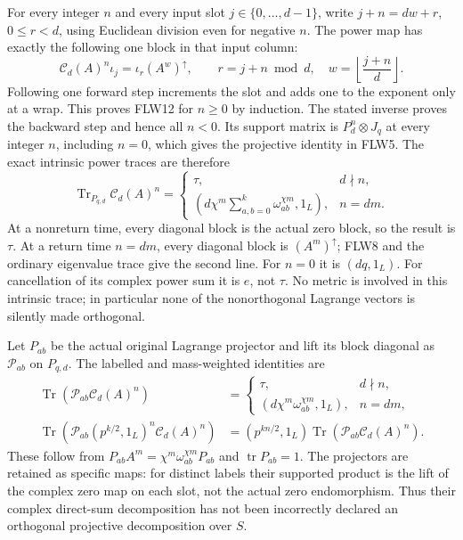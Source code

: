 For every integer $n$ and every input slot $j\in\{0,\ldots,d-1\}$,
write $j+n=dw+r$, $0\le r<d$, using Euclidean division even for
negative $n$. The power map has exactly the following one block
in that input column:
\[
 \mathcal C_d(A)^n\iota_j=\iota_r(A^w)^\uparrow,
 \qquad r=j+n\bmod d,\quad w=\left\lfloor\frac{j+n}{d}\right\rfloor.
 \tag{FLW12}
\]
Following one forward step increments the slot and adds one to the
exponent only at a wrap. This proves FLW12 for $n\ge0$ by induction.
The stated inverse proves the backward step and hence all $n<0$.
Its support matrix is $P_d^n\otimes J_q$ at every integer $n$,
including $n=0$, which gives the projective identity in FLW5.
The exact intrinsic power traces are therefore
\[
 \boxed{\operatorname{Tr}_{P_{q,d}}\mathcal C_d(A)^n
 =\begin{cases}
 \tau,&d\nmid n,\\
 \left(d\chi^m\displaystyle\sum_{a,b=0}^k
                   \omega_{ab}^{\chi m},1_L\right),&n=dm.
 \end{cases}}
 \tag{FLW13}
\]
At a nonreturn time, every diagonal block is the actual zero block,
so the result is $\tau$. At a return time $n=dm$, every diagonal
block is $(A^m)^\uparrow$; FLW8 and the ordinary eigenvalue trace
give the second line. For $n=0$ it is $(dq,1_L)$.
For cancellation of its complex power sum it is $e$, not $\tau$.
No metric is involved in this intrinsic trace; in particular none
of the nonorthogonal Lagrange vectors is silently made orthogonal.

Let $P_{ab}$ be the actual original Lagrange projector and lift
its block diagonal as $\mathcal P_{ab}$ on $P_{q,d}$. The labelled
and mass-weighted identities are
\[
\begin{split}
 \operatorname{Tr}(\mathcal P_{ab}\mathcal C_d(A)^n)
 &=\begin{cases}\tau,&d\nmid n,\\
       (d\chi^m\omega_{ab}^{\chi m},1_L),&n=dm,
    \end{cases}\\
 \operatorname{Tr}(\mathcal P_{ab}(p^{k/2},1_L)^n\mathcal C_d(A)^n)
 &=(p^{kn/2},1_L)
              \operatorname{Tr}(\mathcal P_{ab}\mathcal C_d(A)^n).
\end{split}
\tag{FLW14}
\]
These follow from $P_{ab}A^m=\chi^m\omega_{ab}^{\chi m}P_{ab}$
and $\operatorname{tr}P_{ab}=1$. The projectors are retained as
specific maps: for distinct labels their supported product is the
lift of the complex zero map on each slot, not the actual zero
endomorphism. Thus their complex direct-sum decomposition has not
been incorrectly declared an orthogonal projective decomposition
over $S$.

